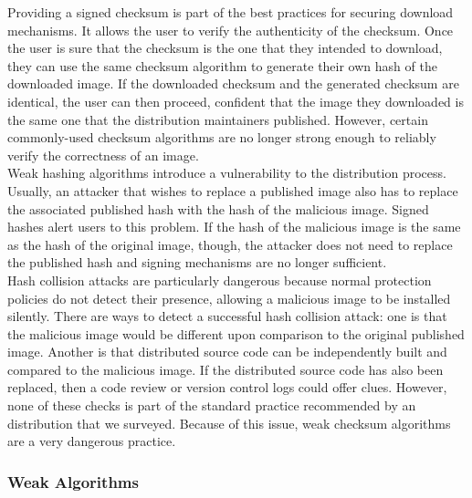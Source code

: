 \documentclass[conference]{IEEEtran}
\begin{document}
Providing a signed checksum is part of the best practices for securing download mechanisms. It
allows the user to verify the authenticity of the checksum. Once the user is sure that the
checksum is the one that they intended to download, they can use the same checksum algorithm to
generate their own hash of the downloaded image. If the downloaded checksum and the generated
checksum are identical, the user can then proceed, confident that the image they downloaded is
the same one that the distribution maintainers published. However, certain commonly-used
checksum algorithms are no longer strong enough to reliably verify the correctness of an image.\\
\indent Weak hashing algorithms introduce a vulnerability to the distribution process. Usually,
an attacker that wishes to replace a published image also has to replace the associated
published hash with the hash of the malicious image. Signed hashes alert users to this problem.
If the hash of the malicious image is the same as the hash of the original image, though, the
attacker does not need to replace the published hash and signing mechanisms are no longer
sufficient.\\
\indent Hash collision attacks are particularly dangerous because normal protection policies do
not detect their presence, allowing a malicious image to be installed silently. There are ways
to detect a successful hash collision attack: one is that the malicious image would be different
upon comparison to the original published image. Another is that distributed source code can be
independently built and compared to the malicious image. If the distributed source code has also
been replaced, then a code review or version control logs could offer clues. However, none of
these checks is part of the standard practice recommended by an distribution that we surveyed.
Because of this issue, weak checksum algorithms are a very dangerous practice.
\subsubsection{Weak Algorithms}
\end{document}
